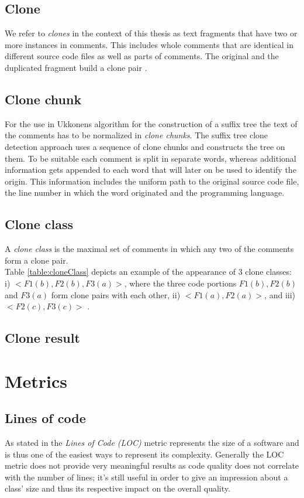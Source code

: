\subsection{Clone}
We refer to \textit{clones} in the context of this thesis as text fragments that have two or more instances in comments. This includes whole comments that are identical in different source code files as well as parts of comments. The original and the duplicated fragment build a clone pair \cite{Roy2007}. 

\subsection{Clone chunk}
For the use in Ukkonens algorithm for the construction of a suffix tree \cite{Ukkonen1995} the text of the comments has to be normalized in \textit{clone chunks}. The suffix tree clone detection approach uses a sequence of clone chunks and constructs the tree on them. To be suitable each comment is split in separate words, whereas additional information gets appended to each word that will later on be used to identify the origin. This information includes the uniform path to the original source code file, the line number in which the word originated and the programming language.

\subsection{Clone class}


A \textit{clone class} is the maximal set of comments in which any two of the comments form a clone pair.\\
Table \ref{table:cloneClass} depicts an example of the appearance of 3
clone classes: i) $<F1(b), F2(b), F3(a)>$, where the three code portions $F1(b), F2(b)$ and $F3(a)$ form clone pairs with each other, ii) $<F1(a), F2(a)>$, and iii) $<F2(c), F3(c)>$ \cite{Bernwieser2014}.


 

\subsection{Clone result}




\section{Metrics}
\subsection{Lines of code}
As stated in \cite{Bernwieser2014} the \textit{Lines of Code (LOC)} metric represents the size of a software and is thus one of the easiest ways to represent its complexity. Generally the LOC metric does not provide very meaningful results as code quality does not correlate with the number of lines; it’s still useful in order to give an impression about a class’ size and thus its respective impact on the overall quality.
